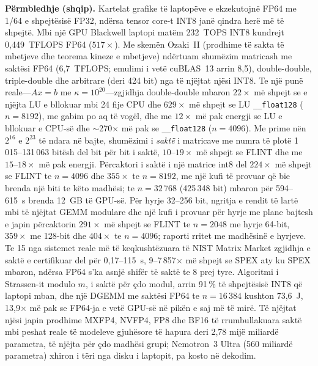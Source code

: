 \documentclass[11pt]{article}
\begin{document}
\noindent\textbf{Përmbledhje (shqip).} Kartelat grafike të laptopëve e ekzekutojnë FP64 me 1/64 e shpejtësisë FP32, ndërsa
tensor core-t INT8 janë qindra herë më të shpejtë. Mbi një GPU Blackwell laptopi matëm 232~TOPS INT8 kundrejt 0,449~TFLOPS
FP64 ($517\times$). Me skemën Ozaki~II (prodhime të sakta të mbetjeve dhe teorema kineze e mbetjeve) ndërtuam shumëzim
matricash me saktësi FP64 (6,7~TFLOPS; emulimi i vetë cuBLAS~13 arrin 8,5), double-double, triple-double dhe arbitrare (deri 424 bit) nga të njëjtat njësi INT8. Te një punë
reale---$Ax=b$ me $\kappa=10^{20}$---zgjidhja double-double mbaron $22\times$ më shpejt se e njëjta LU e bllokuar mbi 24 fije CPU dhe $629\times$ më shpejt
se LU \texttt{\_\_float128} ($n=8192$), me gabim po aq të vogël, dhe me $12\times$ më pak energji se LU e bllokuar e CPU-së dhe $\sim$270$\times$ më pak se \texttt{\_\_float128} ($n=4096$). Me prime nën $2^{16}$ e $2^{23}$ të ndara në bajte, shumëzimi i \emph{saktë} i matricave me numra të plotë 1\,015--131\,063 bitësh del bit për bit i saktë, $10$--$19\times$ më shpejt se FLINT dhe me $15$--$18\times$ më pak energji. Përcaktori i saktë i një matrice int8 del $224\times$ më shpejt se FLINT te $n=4096$ dhe $355\times$ te $n=8192$, me një kufi të provuar që bie brenda një biti te këto madhësi; te $n=32\,768$ (425\,348 bit) mbaron për 594--615~s brenda 12~GB të GPU-së. Për hyrje 32--256 bit, ngritja e rendit të lartë mbi të njëjtat GEMM modulare dhe një kufi i provuar për hyrje me plane bajtesh e japin përcaktorin $291\times$ më shpejt se FLINT te $n=2048$ me hyrje 64-bit, $359\times$ me 128-bit dhe $404\times$ te $n=4096$; raporti rritet me madhësinë e hyrjeve. Te 15 nga sistemet reale më të keqkushtëzuara të NIST Matrix Market zgjidhja e saktë e certifikuar del për 0,17--115~s, 9--7\,857$\times$ më shpejt se SPEX aty ku SPEX mbaron, ndërsa FP64 s'ka asnjë shifër të saktë te 8 prej tyre. Algoritmi i Strassen-it modulo $m$, i saktë për çdo modul, arrin 91\,\% të shpejtësisë INT8 që laptopi mban, dhe një DGEMM me saktësi FP64 te $n=16\,384$ kushton 73,6~J, 13,9$\times$ më pak se FP64-ja e vetë GPU-së në pikën e saj më të mirë. Të njëjtat njësi japin prodhime MXFP4, NVFP4, FP8 dhe BF16 të rrumbullakuara saktë mbi peshat reale të modeleve gjuhësore të hapura deri 2,78 mijë miliardë parametra, të njëjta për çdo madhësi grupi; Nemotron~3 Ultra (560 miliardë parametra) xhiron i tëri nga disku i laptopit, pa kosto në dekodim.
\end{document}
